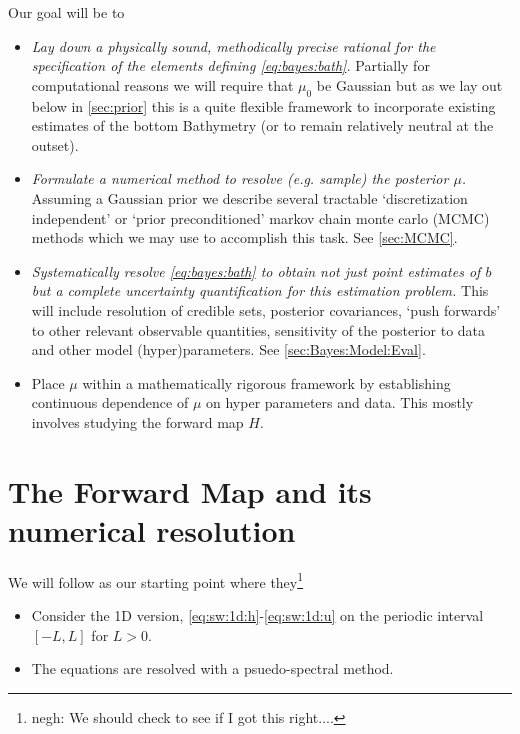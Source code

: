 \documentclass[18pt]{article}
\numberwithin{equation}{subsection}
\newcommand{\beps}{\boldsymbol{\epsilon}}
\begin{document}
Our goal will be to
\begin{itemize}
\item[(i)]  \emph{Lay down a physically sound, methodically precise rational for the specification of the elements defining
\eqref{eq:bayes:bath}.}  Partially for computational reasons we will require that $\mu_0$ be Gaussian but as we lay out below in \cref{sec:prior}
this is a quite flexible framework to incorporate existing estimates of the bottom Bathymetry (or to remain relatively neutral at the outset).
\item[(ii)] \emph{Formulate a numerical method to resolve (e.g. sample) the posterior $\mu$.}  Assuming a Gaussian prior we describe 
 several tractable `discretization independent' or `prior preconditioned' markov chain monte carlo (MCMC) methods which we may use to accomplish this task.
 See \cref{sec:MCMC}.
\item[(iii)] \emph{Systematically resolve \eqref{eq:bayes:bath} to obtain not just point estimates of $b$ but a complete
uncertainty quantification for this estimation problem.}  This will include resolution of credible sets, posterior covariances,
`push forwards' to other relevant observable quantities, sensitivity of the posterior to data and other model (hyper)parameters.
See \cref{sec:Bayes:Model:Eval}.
\item[(iii)] Place $\mu$ within a mathematically rigorous framework by establishing continuous dependence of $\mu$ on hyper parameters and data.  This mostly 
involves studying the forward map $H$.
\end{itemize}

%


\section{The Forward Map and its numerical resolution}

We will follow \cite{PancottoClark2025} as our starting point where they\footnote{negh: We should check to see if I got this right....}
\begin{itemize}
\item Consider the 1D version, \eqref{eq:sw:1d:h}-\eqref{eq:sw:1d:u} on the periodic interval $[-L,L]$ for $L >0$.
\item The equations are resolved with a psuedo-spectral method.
\end{itemize}
\end{document}
